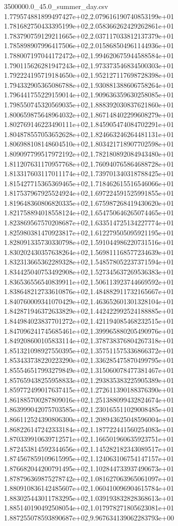 \begin{filecontents*}{3500000.0_45.0_summer_day.csv}
1.779574881899497427e+02,2.079616190740853199e+01
1.781682750433395199e+02,2.058366262429262861e+01
1.783790759129211665e+02,2.037117033812137379e+01
1.785898907996417506e+02,2.015868504961144936e+01
1.788007197044172472e+02,1.994620675944588584e+01
1.790115626281947243e+02,1.973373546834500303e+01
1.792224195719184650e+02,1.952127117698728398e+01
1.794332905365086788e+02,1.930881388606758264e+01
1.796441755229159014e+02,1.909636359630258085e+01
1.798550745320569035e+02,1.888392030837621860e+01
1.800659875648964032e+02,1.867148402299608279e+01
1.802769146223490111e+02,1.845905474084702291e+01
1.804878557053652628e+02,1.824663246264481131e+01
1.806988108148604510e+02,1.803421718907702598e+01
1.809097799517972192e+02,1.782180892084943480e+01
1.811207631170957768e+02,1.760940765864688728e+01
1.813317603117011174e+02,1.739701340318788425e+01
1.815427715365369465e+02,1.718462615516546066e+01
1.817537967925524924e+02,1.697224591525991855e+01
1.819648360806820335e+02,1.675987268419430620e+01
1.821758894018558124e+02,1.654750646265074465e+01
1.823869567570208687e+02,1.633514725134227774e+01
1.825980381470923817e+02,1.612279505095921195e+01
1.828091335730330798e+02,1.591044986220731516e+01
1.830202430357638264e+02,1.569811168577234639e+01
1.832313665362289328e+02,1.548578052237371594e+01
1.834425040753492908e+02,1.527345637269536383e+01
1.836536556540839911e+02,1.506113923744669592e+01
1.838648212733610876e+02,1.484882911732165667e+01
1.840760009341070429e+02,1.463652601301328104e+01
1.842871946372633829e+02,1.442422992524188885e+01
1.844984023837701272e+02,1.421194085468232515e+01
1.847096241745685461e+02,1.399965880205490976e+01
1.849208600105833114e+02,1.378738376804267318e+01
1.851321098927550395e+02,1.357511575336866372e+01
1.853433738220223290e+02,1.336285475870499795e+01
1.855546517993279849e+02,1.315060078477381467e+01
1.857659438255958833e+02,1.293835383225905389e+01
1.859772499017637415e+02,1.272611390188376390e+01
1.861885700287809016e+02,1.251388099432824674e+01
1.863999042075703585e+02,1.230165511029008485e+01
1.866112524390806300e+02,1.208943625048596004e+01
1.868226147242333184e+02,1.187722441560254083e+01
1.870339910639712571e+02,1.166501960635923751e+01
1.872453814592344656e+02,1.145282182343089517e+01
1.874567859109615995e+02,1.124063106754147157e+01
1.876682044200791495e+02,1.102844733937490673e+01
1.878796369875278742e+02,1.081627063965061097e+01
1.880910836142485607e+02,1.060410096904615784e+01
1.883025443011783295e+02,1.039193832828368613e+01
1.885140190492508054e+02,1.017978271805623081e+01
1.887255078593890687e+02,9.967634139062283793e+00

\end{filecontents*}

